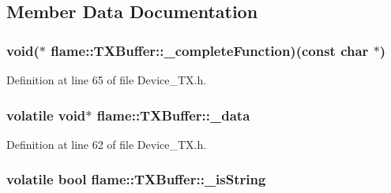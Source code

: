 \subsection{Member Data Documentation}
\hypertarget{classflame_1_1_t_x_buffer_a5843eca013da741fdfec20916239d708}{
\subsubsection[{\-\_\-complete\-Function}]{\setlength{\rightskip}{0pt plus 5cm}void($\ast$ flame\-::\-T\-X\-Buffer\-::\-\_\-complete\-Function)(const char $\ast$)\hspace{0.3cm}{\ttfamily [protected]}}}\label{classflame_1_1_t_x_buffer_a5843eca013da741fdfec20916239d708}


Definition at line 65 of file Device\-\_\-\-T\-X.\-h.

\hypertarget{classflame_1_1_t_x_buffer_a66868ca244713911f52da0edac7bd410}{
\subsubsection[{\-\_\-data}]{\setlength{\rightskip}{0pt plus 5cm}volatile void$\ast$ flame\-::\-T\-X\-Buffer\-::\-\_\-data\hspace{0.3cm}{\ttfamily [protected]}}}\label{classflame_1_1_t_x_buffer_a66868ca244713911f52da0edac7bd410}


Definition at line 62 of file Device\-\_\-\-T\-X.\-h.

\hypertarget{classflame_1_1_t_x_buffer_a266cb738953476ec42dbd08d5d310930}{
\subsubsection[{\-\_\-is\-String}]{\setlength{\rightskip}{0pt plus 5cm}volatile bool flame\-::\-T\-X\-Buffer\-::\-\_\-is\-String\hspace{0.3cm}{\ttfamily [protected]}}}\label{classflame_1_1_t_x_buffer_a266cb738953476ec42dbd08d5d310930}



